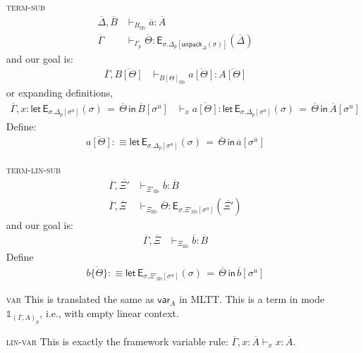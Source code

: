 \documentclass[10pt]{article}
\theoremstyle{definition}
\newcommand{\yields}{\vdash}
\newcommand\E[2]{\ensuremath{\mathsf{E}_{#1}(#2)}}
\newcommand\EEs[4]{\ensuremath{\mathsf{let} \, \mathsf{E}_{#1}(#3) \, = \, {#2} \, \mathsf{in} \, #4}}
\newcommand\unpack[2]{\ensuremath{\mathsf{unpack}_{#1}(#2)}}
\newcommand\unp[2]{\ensuremath{{#2}^u}}
\newcommand{\modeof}[1]{{#1}_p}
\newcommand{\upstairs}[1]{\overline{#1}}
\newcommand\qvar[1]{\ensuremath{\mathsf{var}_{#1}}}
\newcommand\One{\ensuremath{\mathds{1}}}
\newcommand{\fibshape}[1]{\ensuremath{{#1}_{\mathrm{fib}}}}
\begin{document}
\begin{enumerate}
\item[\textsc{term-sub}] 
\begin{align*}
\upstairs{\Delta}, \upstairs{B} &\yields_{\fibshape{B}} \upstairs{a} : \upstairs{A} \\
\upstairs{\Gamma} &\yields_{\modeof{\Gamma}} \upstairs{\Theta} : \E{\sigma.\modeof{\Delta}[\unpack{\Delta}{\sigma}]}{\upstairs{\Delta}}
\end{align*} 
and our goal is:
\begin{align*}
\upstairs{\Gamma}, \upstairs{B[\Theta]} &\yields_{\fibshape{B[\Theta]}} \upstairs{a[\Theta]} : \upstairs{A[\Theta]}
\end{align*}
or expanding definitions,
\begin{align*}
\upstairs{\Gamma}, x : \EEs{\sigma.\modeof{\Delta}[\unp{\Delta}{\sigma}]}{\upstairs{\Theta}}{\sigma}{\upstairs{B}[\unp{\Delta}{\sigma}]} &\yields_x \upstairs{a[\Theta]} : \EEs{\sigma.\modeof{\Delta}[\unp{\Delta}{\sigma}]}{\upstairs{\Theta}}{\sigma}{\upstairs{A}[\unp{\Delta}{\sigma}]}
\end{align*}
Define:
\begin{align*}
\upstairs{a[\Theta]} :\equiv \EEs{\sigma.\modeof{\Delta}[\unp{\Delta}{\sigma}]}{\upstairs{\Theta}}{\sigma}{\upstairs{a}[\unp{\Delta}{\sigma}]}
\end{align*}
\item[\textsc{term-lin-sub}] 
\begin{align*}
\upstairs{\Gamma}, \upstairs{\Xi'} &\yields_{\fibshape{\Xi'}} \upstairs{b} : \upstairs{B} \\
\upstairs{\Gamma}, \upstairs{\Xi} &\yields_{\fibshape{\Xi}} \upstairs{\Theta} : \E{\sigma.\fibshape{\Xi'}[\unp{\Xi'}{\sigma}]}{\upstairs{\Xi'}}
\end{align*} 
and our goal is:
\begin{align*}
\upstairs{\Gamma}, \upstairs{\Xi} &\yields_{\fibshape{\Xi}} \upstairs{b} : \upstairs{B}
\end{align*}
Define
\begin{align*}
\upstairs{b\{\Theta\}} :\equiv \EEs{\sigma.\fibshape{\Xi'}[\unp{\Xi'}{\sigma}]}{\upstairs{\Theta}}{\sigma}{\upstairs{b}[\unp{\Xi'}{\sigma}]}
\end{align*}
\item[\textsc{var}] This is translated the same as $\qvar{A}$ in MLTT. This is a term in mode $\One_{\modeof{(\Gamma, A)}}$, i.e., with empty linear context.
\item[\textsc{lin-var}] This is exactly the framework variable rule: $\upstairs{\Gamma}, x : \upstairs{A} \yields_x x : \upstairs{A}$.
\end{enumerate}
\end{document}
